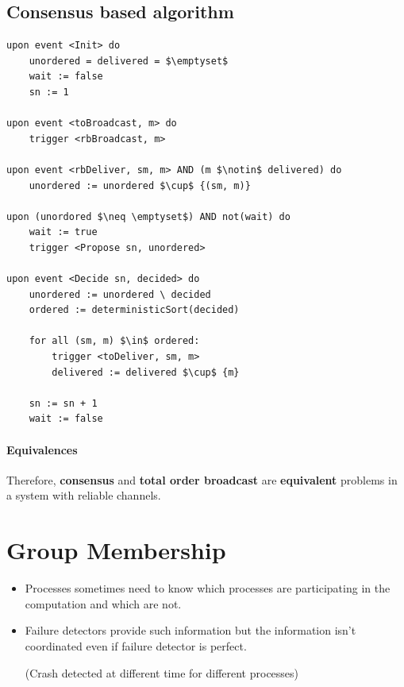 \subsection{Consensus based algorithm}
\begin{lstlisting}[caption=Total order implementation, mathescape]
upon event <Init> do
    unordered = delivered = $\emptyset$
    wait := false
    sn := 1

upon event <toBroadcast, m> do
    trigger <rbBroadcast, m>

upon event <rbDeliver, sm, m> AND (m $\notin$ delivered) do
    unordered := unordered $\cup$ {(sm, m)}

upon (unordored $\neq \emptyset$) AND not(wait) do
    wait := true
    trigger <Propose sn, unordered>

upon event <Decide sn, decided> do
    unordered := unordered \ decided
    ordered := deterministicSort(decided)

    for all (sm, m) $\in$ ordered:
        trigger <toDeliver, sm, m>
        delivered := delivered $\cup$ {m}

    sn := sn + 1
    wait := false
\end{lstlisting}

\paragraph{Equivalences} Therefore, \textbf{consensus} and \textbf{total order
broadcast} are \textbf{equivalent} problems in a system with reliable channels.

\section{Group Membership}

\begin{itemize}
    \item Processes sometimes need to know which processes are participating in
    the computation and which are not.

    \item Failure detectors provide such information but the information isn't
        coordinated even if failure detector is perfect.

        (Crash detected at different time for different processes)
\end{itemize}


